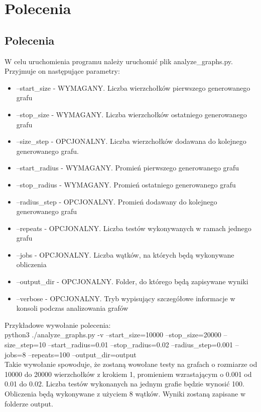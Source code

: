
\chapter{Polecenia}

	\section{Polecenia}
		\label{polecenia:analizator}

		\noindent W celu uruchomienia programu należy uruchomić plik analyze\_graphs.py. Przyjmuje on następujące parametry:
		\begin{itemize}
			\item --start\_size - WYMAGANY. Liczba wierzchołków pierwszego generowanego grafu

			\item --stop\_size - WYMAGANY. Liczba wierzchołków ostatniego generowanego grafu

			\item --size\_step - OPCJONALNY. Liczba wierzchołków dodawana do kolejnego generowanego grafu.
			\item --start\_radius - WYMAGANY. Promień pierwszego generowanego grafu

			\item --stop\_radius - WYMAGANY. Promień ostatniego generowanego grafu

			\item --radius\_step - OPCJONALNY. Promień dodawany do kolejnego generowanego grafu

			\item --repeats - OPCJONALNY. Liczba testów wykonywanych w ramach jednego grafu

			\item --jobs - OPCJONALNY. Liczba wątków, na których będą wykonywane obliczenia

			\item --output\_dir - OPCJONALNY. Folder, do którego będą zapisywane wyniki

			\item --verbose - OPCJONALNY. Tryb wypisujący szczegółowe informacje w konsoli podczas analizowania grafów
		\end{itemize}

		Przykładowe wywołanie polecenia:\\
		python3 ./analyze\_graphs.py -v --start\_size=10000 --stop\_size=20000 --size\_step=10 --start\_radius=0.01 --stop\_radius=0.02 --radius\_step=0.001 --jobs=8 --repeats=100 --output\_dir=output\\
		Takie wywołanie spowoduje, że zostaną wowołane testy na grafach o rozmiarze od 10000 do 20000 wierzchołków z krokiem 1, promieniem wzrastającym o 0.001 od 0.01 do 0.02. Liczba testów wykonanych na jednym grafie będzie wynosić 100. Obliczenia będą wykonywane z użyciem 8 wątków. Wyniki zostaną zapisane w folderze output.

		

